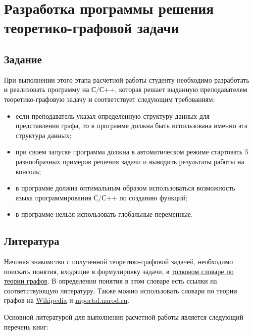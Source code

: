 
\chapter{Разработка программы решения теоретико-графовой задачи}

\section{Задание}

При выполнении этого этапа расчетной работы студенту необходимо
разработать и реализовать программу на С/С++, которая решает выданную
преподавателем теоретико-графовую задачу и соответствует следующим
требованиям:

\begin{itemize}
\item если преподаватель указал определенную структуру данных для
  представления графа, то в программе должна быть использована именно
  эта структура данных;
\item при своем запуске программа должна в автоматическом режиме
  стартовать 5 разнообразных примеров решения задачи и выводить
  результаты работы на консоль;
\item в программе должна оптимальным образом использоваться возможность
  языка программирования С/С++ по созданию функций;
\item в программе нельзя использовать глобальные переменные.
\end{itemize}

\section{Литература}

Начиная знакомство с полученной теоретико-графовой задачей, необходимо
поискать понятия, входящие в формулировку задачи, в
\href{http://pco.iis.nsk.su/grapp2/html/main.htm}{толковом словаре по
  теории графов}. В определении понятия в этом словаре есть ссылки на
соответствующую литературу. Также можно использовать словари по теории
графов на
\href{http://ru.wikipedia.org/wiki/%D0%A1%D0%BB%D0%BE%D0%B2%D0%B0%D1%80%D1%8C_%D1%82%D0%B5%D1%80%D0%BC%D0%B8%D0%BD%D0%BE%D0%B2_%D1%82%D0%B5%D0%BE%D1%80%D0%B8%D0%B8_%D0%B3%D1%80%D0%B0%D1%84%D0%BE%D0%B2}{Wikipedia}
и \href{http://mportal.narod.ru/Graphs/Search.html}{mportal.narod.ru}.

Основной литературой для выполнения расчетной работы является
следующий перечень книг:

